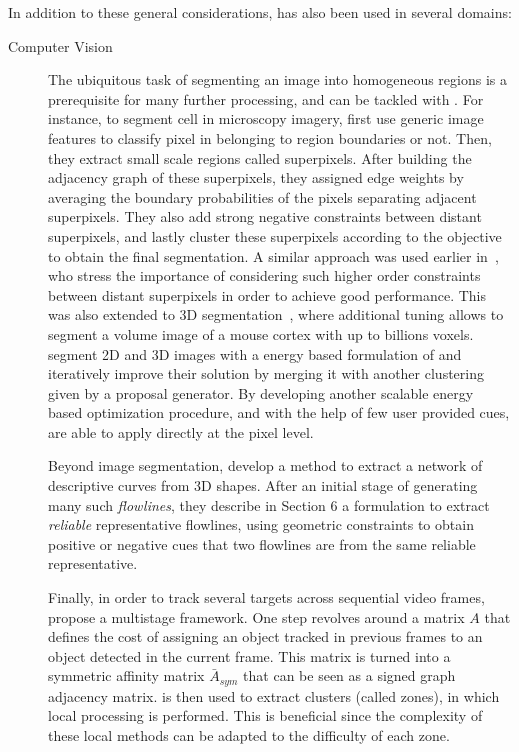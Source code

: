 In addition to these general considerations, \pcc{} has also been used in several domains:
\begin{description}
   \item[Computer Vision]
      The ubiquitous task of segmenting an image into homogeneous regions is a prerequisite for many
      further processing, and can be tackled with \pcc{}. For instance, to segment cell in
      microscopy imagery, \textcite{CellSeg14} first use generic image features to classify pixel in
      belonging to region boundaries or not. Then, they extract small scale regions called
      superpixels. After building the adjacency graph of these superpixels, they assigned edge
      weights by averaging the boundary probabilities of the pixels separating adjacent
      superpixels. They also add strong negative constraints between distant superpixels, and lastly
      cluster these superpixels according to the \pcc{} objective to obtain the final segmentation.
      A similar approach was used earlier in~\textcite{Kim2011}, who stress the importance of
      considering such higher order constraints between distant superpixels in order to achieve good
      performance. This was also extended to 3D segmentation~\autocite{VolumeSegmentation12}, where
      additional tuning allows to segment a volume image of a mouse cortex with up to billions
      voxels. \Textcite{Beier2015} segment 2D and 3D images with a energy based formulation of
      \pcc{} and iteratively improve their solution by merging it with another clustering given by a
      proposal generator. By developing another scalable energy based optimization procedure, and
      with the help of few user provided cues, \textcite{Bagon2011} are able to apply \pcc{}
      directly at the pixel level.

      Beyond image segmentation, \textcite{Shape3D17} develop a method to extract a network of
      descriptive curves from 3D shapes.  After an initial stage of generating many such
      \emph{flowlines}, they describe in Section 6 a \pcc{} formulation to extract \emph{reliable}
      representative flowlines, using geometric constraints to obtain positive or negative cues that
      two flowlines are from the same reliable representative.

      Finally, in order to track several targets across sequential video frames,
      \textcite{multiTracking15} propose a multistage framework. One step revolves around a matrix
      $A$ that defines the cost of assigning an object tracked in previous frames to an object
      detected in the current frame. This matrix is turned into a symmetric affinity matrix
      $\bar{A}_{sym}$ that can be seen as a signed graph adjacency matrix. \pcc{} is then used to extract clusters
      (called zones), in which local processing is performed. This is beneficial since the
      complexity of these local methods can be adapted to the difficulty of each zone.


\end{description}
